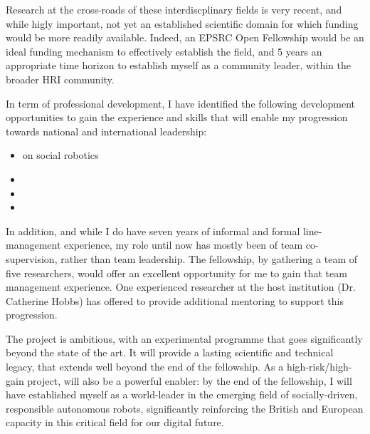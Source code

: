 Research at the cross-roads of these interdiscplinary fields is very recent, and
while higly important, not yet an established scientific domain for which
funding would be more readily available. Indeed, an EPSRC Open Fellowship would
be an ideal funding mechanism to effectively establish the field, and 5 years an
appropriate time horizon to establish myself as a community leader, within the
broader HRI community.

In term of professional development, I have identified the following development
opportunities to gain the experience and skills that will enable my progression
towards national and international leadership:

\begin{itemize}
    \item {} on social robotics
    \item {}
    \item {}
    \item {}
\end{itemize}

In addition, and while I do have seven years of informal and formal
line-management experience, my role until now has mostly been of team
co-supervision, rather than team leadership. The fellowship, by gathering a team
of five researchers, would offer an excellent opportunity for me to gain that
team management experience. One experienced researcher at the host institution
(Dr. Catherine Hobbs) has offered to provide additional mentoring to support
this progression.


The project is ambitious, with an experimental programme that goes significantly
beyond the state of the art. It will provide a lasting scientific and technical
legacy, that extends well beyond the end of the fellowship. As a
high-risk/high-gain project, \project will also be a powerful enabler: by the
end of the fellowship, I will have established myself as a world-leader in the
emerging field of socially-driven, responsible autonomous robots, significantly
reinforcing the British and European capacity in this critical field for our
digital future.



